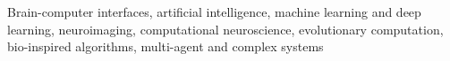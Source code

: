 
\begin{cvparagraph}


Brain-computer interfaces, artificial intelligence, machine learning and deep learning, neuroimaging, computational neuroscience, evolutionary computation, bio-inspired algorithms, multi-agent and complex systems

\end{cvparagraph}
